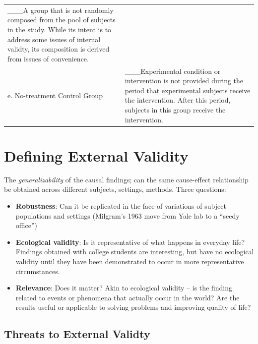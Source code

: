 \documentclass[
  english,
]{book}
\providecommand{\tightlist}{%
  \setlength{\itemsep}{0pt}\setlength{\parskip}{0pt}}
\begin{document}
\begin{longtable}[]{@{}ll@{}}
\begin{minipage}[t]{0.66\columnwidth}
\_\_\_A group that is not randomly composed from the pool of subjects in the study. While its intent is to address some issues of internal validty, its composition is derived from issues of convenience.\strut
\end{minipage}\tabularnewline
\begin{minipage}[t]{0.28\columnwidth}\raggedright
e. No-treatment Control Group\strut
\end{minipage} & \begin{minipage}[t]{0.66\columnwidth}\raggedright
\_\_\_Experimental condition or intervention is not provided during the period that experimental subjects receive the intervention. After this period, subjects in this group receive the intervention.\strut
\end{minipage}\tabularnewline
\bottomrule
\end{longtable}

\hypertarget{defining-external-validity}{%
\section{Defining External Validity}\label{defining-external-validity}}

The \emph{generalizability} of the causal findings; can the same cause-effect relationship be obtained across different subjects, settings, methods. Three questions:

\begin{itemize}
\tightlist
\item
  \textbf{Robustness}: Can it be replicated in the face of variations of subject populations and settings (Milgram's 1963 move from Yale lab to a ``seedy office'')
\item
  \textbf{Ecological validity}: Is it representative of what happens in everyday life? Findings obtained with college students are interesting, but have no ecological validity until they have been demonstrated to occur in more representative circumstances.
\item
  \textbf{Relevance}: Does it matter? Akin to ecological validity -- is the finding related to events or phenomena that actually occur in the world? Are the results useful or applicable to solving problems and improving quality of life?
\end{itemize}

\hypertarget{threats-to-external-validty}{%
\subsection{Threats to External Validty}\label{threats-to-external-validty}}
\end{document}
